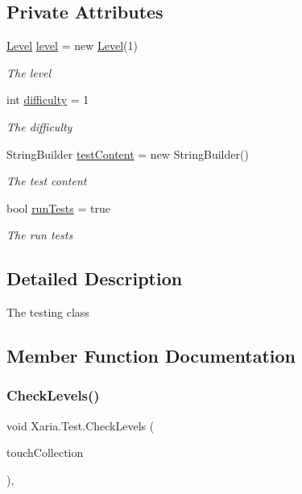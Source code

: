 \subsection*{Private Attributes}
\begin{DoxyCompactItemize}
\item 
\hyperlink{classXaria_1_1Level}{Level} \hyperlink{classXaria_1_1Test_a00af721eecb1813fba1f30afec4044b9}{level} = new \hyperlink{classXaria_1_1Level}{Level}(1)
\begin{DoxyCompactList}\small\item\em The level \end{DoxyCompactList}\item 
int \hyperlink{classXaria_1_1Test_a26123efa80dd7b2239686616e87ee20d}{difficulty} = 1
\begin{DoxyCompactList}\small\item\em The difficulty \end{DoxyCompactList}\item 
String\+Builder \hyperlink{classXaria_1_1Test_afc1b76ea79ceceeb584f3a3a04cd01d3}{test\+Content} = new String\+Builder()
\begin{DoxyCompactList}\small\item\em The test content \end{DoxyCompactList}\item 
bool \hyperlink{classXaria_1_1Test_ac119e60fe2a56444b7c8673591328611}{run\+Tests} = true
\begin{DoxyCompactList}\small\item\em The run tests \end{DoxyCompactList}\end{DoxyCompactItemize}


\subsection{Detailed Description}
The testing class 



\subsection{Member Function Documentation}
\mbox{\label{classXaria_1_1Test_a510dbeecb286790088a62c01883875a9}} 
\subsubsection{\texorpdfstring{Check\+Levels()}{CheckLevels()}}
{\footnotesize\ttfamily void Xaria.\+Test.\+Check\+Levels (\begin{DoxyParamCaption}\item[{Touch\+Collection}]{touch\+Collection }\end{DoxyParamCaption})\hspace{0.3cm}{\ttfamily [inline]}, {\ttfamily [private]}}



